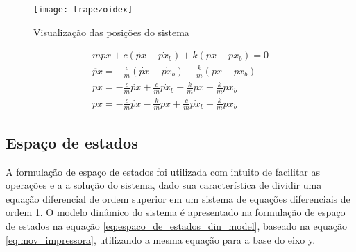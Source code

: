 \begin{figure}[!htb]
    \centering
    \caption{Visualização das posições do sistema}
    \texttt{[image: trapezoidex]}

    \label{fig:din_model}
\end{figure}

\begin{multline}
    \label{eq:mov_impressora}
    m \ddot{px} + c(\dot{px} - \dot{px_b}) + k(px-px_b) = 0 \\
    \ddot{px}  = - \frac{c}{m}(\dot{px} - \dot{px_b}) - \frac{k}{m}(px-px_b) \\
    \ddot{px}  = - \frac{c}{m} \dot{px} + \frac{c}{m} \dot
    {px_b} - \frac{k}{m} px + \frac{k}{m} px_b \\
    \ddot{px}  = - \frac{c}{m} \dot{px} - \frac{k}{m} px + \frac{c}{m} \dot{px_b} + \frac{k}{m} px_b
\end{multline}

\subsection{Espaço de estados}
A formulação de espaço de estados foi utilizada com intuito de facilitar as operações e
a a solução do sistema, dado sua característica de dividir uma equação diferencial
de ordem superior em um sistema de equações diferenciais de ordem 1.
O modelo dinâmico do sistema é apresentado na formulação de espaço de estados 
na equação \ref{eq:espaco_de_estados_din_model}, baseado na equação \ref{eq:mov_impressora},
utilizando a mesma equação para a base do eixo y.

